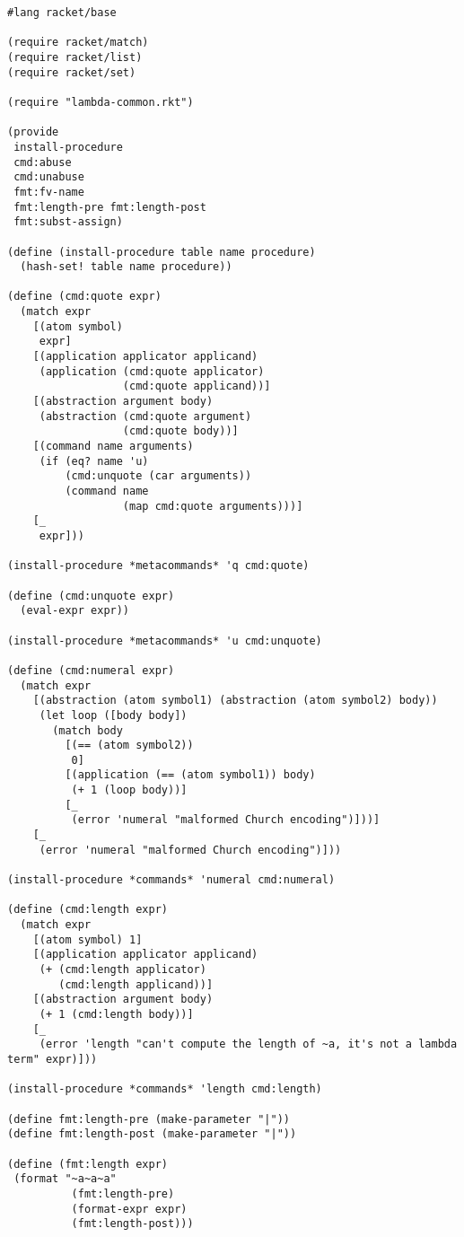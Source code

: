 \begin{lstlisting}[language=racket]
#lang racket/base

(require racket/match)
(require racket/list)
(require racket/set)

(require "lambda-common.rkt")

(provide
 install-procedure
 cmd:abuse
 cmd:unabuse
 fmt:fv-name
 fmt:length-pre fmt:length-post
 fmt:subst-assign)

(define (install-procedure table name procedure)
  (hash-set! table name procedure))

(define (cmd:quote expr)
  (match expr
    [(atom symbol)
     expr]
    [(application applicator applicand)
     (application (cmd:quote applicator)
                  (cmd:quote applicand))]
    [(abstraction argument body)
     (abstraction (cmd:quote argument)
                  (cmd:quote body))]
    [(command name arguments)
     (if (eq? name 'u)
         (cmd:unquote (car arguments))
         (command name
                  (map cmd:quote arguments)))]
    [_
     expr]))

(install-procedure *metacommands* 'q cmd:quote)

(define (cmd:unquote expr)
  (eval-expr expr))

(install-procedure *metacommands* 'u cmd:unquote)

(define (cmd:numeral expr)
  (match expr
    [(abstraction (atom symbol1) (abstraction (atom symbol2) body))
     (let loop ([body body])
       (match body
         [(== (atom symbol2))
          0]
         [(application (== (atom symbol1)) body)
          (+ 1 (loop body))]
         [_
          (error 'numeral "malformed Church encoding")]))]
    [_
     (error 'numeral "malformed Church encoding")]))

(install-procedure *commands* 'numeral cmd:numeral)

(define (cmd:length expr)
  (match expr
    [(atom symbol) 1]
    [(application applicator applicand)
     (+ (cmd:length applicator)
        (cmd:length applicand))]
    [(abstraction argument body)
     (+ 1 (cmd:length body))]
    [_
     (error 'length "can't compute the length of ~a, it's not a lambda term" expr)]))

(install-procedure *commands* 'length cmd:length)

(define fmt:length-pre (make-parameter "|"))
(define fmt:length-post (make-parameter "|"))

(define (fmt:length expr)
 (format "~a~a~a"
          (fmt:length-pre)
          (format-expr expr)
          (fmt:length-post)))


\end{lstlisting}
